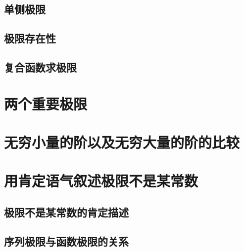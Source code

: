 \subsection{单侧极限}
\subsection{极限存在性}
\subsection{复合函数求极限}
\begin{exercise}

\end{exercise}
\section{两个重要极限}
\begin{exercise}

\end{exercise}
\section{无穷小量的阶以及无穷大量的阶的比较}
\begin{exercise}

\end{exercise}
\section{用肯定语气叙述极限不是某常数}
\subsection{极限不是某常数的肯定描述}
\subsection{序列极限与函数极限的关系}
\begin{exercise}

\end{exercise}
\begin{exercise*}

\end{exercise*}



\endinput
